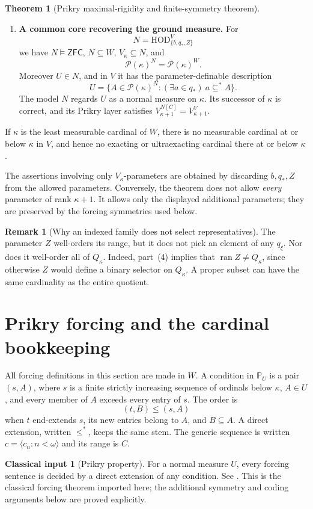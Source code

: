 \documentclass[11pt,letterpaper]{article}
\theoremstyle{definition}
\newtheorem{theorem}[definition]{Theorem}
\newtheorem{remark}[definition]{Remark}
\newtheorem{inputthm}{Classical input}
\numberwithin{equation}{section}
\newcommand{\ZFC}{\mathsf{ZFC}}
\newcommand{\HOD}{\mathrm{HOD}}
\newcommand{\Pow}{\mathcal P}
\newcommand{\PP}{\mathbb P}
\newcommand{\ran}{\operatorname{ran}}
\begin{document}
\begin{theorem}[Prikry maximal-rigidity and finite-symmetry theorem]
\begin{enumerate}[label=\textup{(\arabic*)}]
\item \textbf{A common core recovering the ground measure.} For
\[
 N=\HOD_{\{b,q_*,Z\}}^V
\]
we have $N\models\ZFC$, $N\subseteq W$, $V_\kappa\subseteq N$, and
\[
 \Pow(\kappa)^N=\Pow(\kappa)^W.
\]
Moreover $U\in N$, and in $V$ it has the parameter-definable description
\[
 U=\{A\in\Pow(\kappa)^N:(\exists a\in q_*)\ a\subseteq^* A\}.
\]
The model $N$ regards $U$ as a normal measure on $\kappa$. Its successor of $\kappa$ is correct, and its Prikry layer satisfies $V_{\kappa+1}^{N[C]}=V_{\kappa+1}^V$.
\end{enumerate}
If $\kappa$ is the least measurable cardinal of $W$, there is no measurable cardinal at or below $\kappa$ in $V$, and hence no exacting or ultraexacting cardinal there at or below $\kappa$.
\end{theorem}

The assertions involving only $V_\kappa$-parameters are obtained by discarding $b,q_*,Z$ from the allowed parameters. Conversely, the theorem does not allow \emph{every} parameter of rank $\kappa+1$. It allows only the displayed additional parameters; they are preserved by the forcing symmetries used below.

\begin{remark}[Why an indexed family does not select representatives]\label{rem:index}
The parameter $Z$ well-orders its range, but it does not pick an element of any $q_\xi$. Nor does it well-order all of $Q_\kappa$. Indeed, part~(4) implies that $\ran Z\neq Q_\kappa$, since otherwise $Z$ would define a binary selector on $Q_\kappa$. A proper subset can have the same cardinality as the entire quotient.
\end{remark}

\section{Prikry forcing and the cardinal bookkeeping}\label{sec:prikry}

All forcing definitions in this section are made in $W$. A condition in $\PP_U$ is a pair $(s,A)$, where $s$ is a finite strictly increasing sequence of ordinals below $\kappa$, $A\in U$, and every member of $A$ exceeds every entry of $s$. The order is
\[
 (t,B)\leq(s,A)
\]
when $t$ end-extends $s$, its new entries belong to $A$, and $B\subseteq A$. A direct extension, written $\leq^*$, keeps the same stem. The generic sequence is written $c=\langle c_n:n<\omega\rangle$ and its range is $C$.

\begin{inputthm}[Prikry property]\label{input:prikry}
For a normal measure $U$, every forcing sentence is decided by a direct extension of any condition. See \cite[Theorem~3.14 and Corollary~3.15]{benhamou}. This is the classical forcing theorem imported here; the additional symmetry and coding arguments below are proved explicitly.
\end{inputthm}
\end{document}
